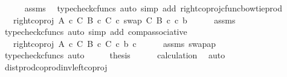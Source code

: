 \begin{isabellebody}
\ \ \ \ \isamarkupfalse%
\ assms\ \isamarkupfalse%
\ {\isacharparenleft}{\kern0pt}typecheck{\isacharunderscore}{\kern0pt}cfuncs{\isacharcomma}{\kern0pt}\ auto\ simp\ add{\isacharcolon}{\kern0pt}\ right{\isacharunderscore}{\kern0pt}coproj{\isacharunderscore}{\kern0pt}cfunc{\isacharunderscore}{\kern0pt}bowtie{\isacharunderscore}{\kern0pt}prod{\isacharparenright}{\kern0pt}\isanewline
\ \ \isamarkupfalse%
\ \isamarkupfalse%
\ {\isachardoublequoteopen}{\isachardot}{\kern0pt}{\isachardot}{\kern0pt}{\isachardot}{\kern0pt}\ {\isacharequal}{\kern0pt}\ right{\isacharunderscore}{\kern0pt}coproj\ {\isacharparenleft}{\kern0pt}A\ {\isasymtimes}\isactrlsub c\ C{\isacharparenright}{\kern0pt}\ {\isacharparenleft}{\kern0pt}B\ {\isasymtimes}\isactrlsub c\ C{\isacharparenright}{\kern0pt}\ {\isasymcirc}\isactrlsub c\ swap\ C\ B\ {\isasymcirc}\isactrlsub c\ {\isasymlangle}c{\isacharcomma}{\kern0pt}\ b{\isasymrangle}{\isachardoublequoteclose}\isanewline
\ \ \ \ \isamarkupfalse%
\ assms\ \isamarkupfalse%
\ {\isacharparenleft}{\kern0pt}typecheck{\isacharunderscore}{\kern0pt}cfuncs{\isacharcomma}{\kern0pt}\ auto\ simp\ add{\isacharcolon}{\kern0pt}\ comp{\isacharunderscore}{\kern0pt}associative{}{\isacharparenright}{\kern0pt}\isanewline
\ \ \isamarkupfalse%
\ \isamarkupfalse%
\ {\isachardoublequoteopen}{\isachardot}{\kern0pt}{\isachardot}{\kern0pt}{\isachardot}{\kern0pt}\ {\isacharequal}{\kern0pt}\ right{\isacharunderscore}{\kern0pt}coproj\ {\isacharparenleft}{\kern0pt}A\ {\isasymtimes}\isactrlsub c\ C{\isacharparenright}{\kern0pt}\ {\isacharparenleft}{\kern0pt}B\ {\isasymtimes}\isactrlsub c\ C{\isacharparenright}{\kern0pt}\ {\isasymcirc}\isactrlsub c\ {\isasymlangle}b{\isacharcomma}{\kern0pt}\ c{\isasymrangle}{\isachardoublequoteclose}\isanewline
\ \ \ \ \isamarkupfalse%
\ assms\ swap{\isacharunderscore}{\kern0pt}ap\ \isamarkupfalse%
\ {\isacharparenleft}{\kern0pt}typecheck{\isacharunderscore}{\kern0pt}cfuncs{\isacharcomma}{\kern0pt}\ auto{\isacharparenright}{\kern0pt}\isanewline
\ \ \isamarkupfalse%
\ \isamarkupfalse%
\ {\isacharquery}{\kern0pt}thesis\isanewline
\ \ \ \ \isamarkupfalse%
\ calculation\ \isamarkupfalse%
\ auto\isanewline
{}\isamarkupfalse%
%
\endisatagproof
{\isafoldproof}%
%
\isadelimproof
\isanewline
%
\endisadelimproof
\isanewline
{}\isamarkupfalse%
\ dist{\isacharunderscore}{\kern0pt}prod{\isacharunderscore}{\kern0pt}coprod{\isacharunderscore}{\kern0pt}inv{}{\isacharunderscore}{\kern0pt}left{\isacharunderscore}{\kern0pt}coproj{\isacharcolon}{\kern0pt}\isanewline

\end{isabellebody}
